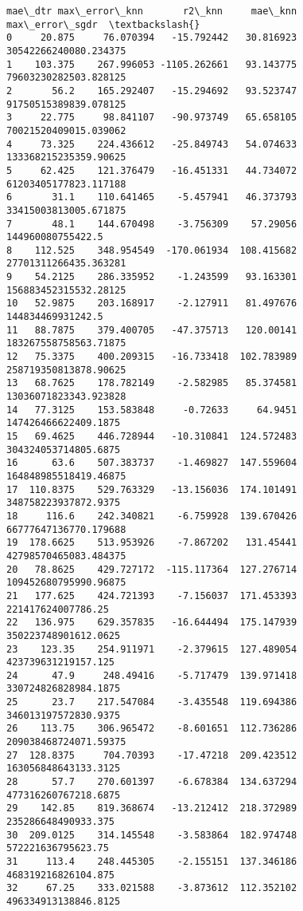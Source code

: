 \documentclass[11pt]{article}
\begin{document}
\begin{tcolorbox}[breakable, size=fbox, boxrule=.5pt, pad at break*=1mm, opacityfill=0]
\begin{Verbatim}[commandchars=\\\{\}]
     mae\_dtr max\_error\_knn       r2\_knn     mae\_knn          max\_error\_sgdr  \textbackslash{}
0     20.875     76.070394   -15.792442   30.816923   30542266240080.234375
1    103.375    267.996053 -1105.262661   93.143775   79603230282503.828125
2       56.2    165.292407   -15.294692   93.523747   91750515389839.078125
3     22.775     98.841107   -90.973749   65.658105   70021520409015.039062
4     73.325    224.436612   -25.849743   54.074633   133368215235359.90625
5     62.425    121.376479   -16.451331   44.734072   61203405177823.117188
6       31.1    110.641465    -5.457941   46.373793   33415003813005.671875
7       48.1    144.670498    -3.756309    57.29056       144960080755422.5
8    112.525    348.954549  -170.061934  108.415682   27701311266435.363281
9    54.2125    286.335952    -1.243599   93.163301   156883452315532.28125
10   52.9875    203.168917    -2.127911   81.497676       144834469931242.5
11   88.7875    379.400705   -47.375713   120.00141   183267558758563.71875
12   75.3375    400.209315   -16.733418  102.783989   258719350813878.90625
13   68.7625    178.782149    -2.582985   85.374581   13036071823343.923828
14   77.3125    153.583848     -0.72633     64.9451    147426466622409.1875
15   69.4625    446.728944   -10.310841  124.572483    304324053714805.6875
16      63.6    507.383737    -1.469827  147.559604   164848985518419.46875
17  110.8375    529.763329   -13.156036  174.101491    348758223937872.9375
18     116.6    242.340821    -6.759928  139.670426   66777647136770.179688
19  178.6625    513.953926    -7.867202   131.45441   42798570465083.484375
20   78.8625    429.727172  -115.117364  127.276714   109452680795990.96875
21   177.625    424.721393    -7.156037  171.453393      221417624007786.25
22   136.975    629.357835   -16.644494  175.147939    350223748901612.0625
23    123.35    254.911971    -2.379615  127.489054     423739631219157.125
24      47.9     248.49416    -5.717479  139.971418    330724826828984.1875
25      23.7    217.547084    -3.435548  119.694386    346013197572830.9375
26    113.75    306.965472    -8.601651  112.736286   209038468724071.59375
27  128.8375     704.70393    -17.47218  209.423512    163056848643133.3125
28      57.7    270.601397    -6.678384  134.637294    477316260767218.6875
29    142.85    819.368674   -13.212412  218.372989     235286648490933.375
30  209.0125    314.145548    -3.583864  182.974748      572221636795623.75
31     113.4    248.445305    -2.155151  137.346186     468319216826104.875
32     67.25    333.021588    -3.873612  112.352102    496334913138846.8125

\end{Verbatim}
\end{tcolorbox}
\end{document}
